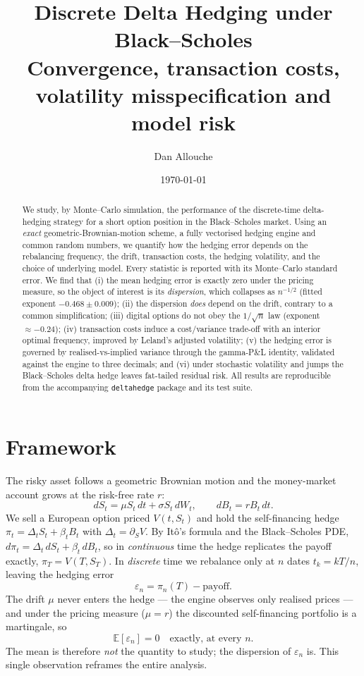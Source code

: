 \documentclass[11pt]{article}
\title{\textbf{Discrete Delta Hedging under Black--Scholes}\\[2pt]
\large Convergence, transaction costs, volatility misspecification and model risk}
\author{Dan Allouche}
\date{\today}
\newcommand{\E}{\mathbb{E}}
\newcommand{\eps}{\varepsilon}
\begin{document}
\maketitle

\begin{abstract}
\noindent
We study, by Monte--Carlo simulation, the performance of the discrete-time
delta-hedging strategy for a short option position in the Black--Scholes market.
Using an \emph{exact} geometric-Brownian-motion scheme, a fully vectorised
hedging engine and common random numbers, we quantify how the hedging error
depends on the rebalancing frequency, the drift, transaction costs, the hedging
volatility, and the choice of underlying model. Every statistic is reported with
its Monte--Carlo standard error. We find that (i) the mean hedging error is
exactly zero under the pricing measure, so the object of interest is its
\emph{dispersion}, which collapses as $n^{-1/2}$ (fitted exponent
$-0.468\pm0.009$); (ii) the dispersion \emph{does} depend on the drift, contrary
to a common simplification; (iii) digital options do not obey the $1/\sqrt{n}$
law (exponent $\approx-0.24$); (iv) transaction costs induce a cost/variance
trade-off with an interior optimal frequency, improved by Leland's adjusted
volatility; (v) the hedging error is governed by realised-vs-implied variance
through the gamma-P\&L identity, validated against the engine to three decimals;
and (vi) under stochastic volatility and jumps the Black--Scholes delta hedge
leaves fat-tailed residual risk. All results are reproducible from the
accompanying \texttt{deltahedge} package and its test suite.
\end{abstract}

\section{Framework}

The risky asset follows a geometric Brownian motion and the money-market account
grows at the risk-free rate $r$:
\[
dS_t = \mu S_t\,dt + \sigma S_t\,dW_t,
\qquad
dB_t = r B_t\,dt .
\]
We sell a European option priced $V(t,S_t)$ and hold the self-financing hedge
$\pi_t = \Delta_t S_t + \beta_t B_t$ with $\Delta_t = \partial_S V$. By It\^o's
formula and the Black--Scholes PDE,
$d\pi_t = \Delta_t\,dS_t + \beta_t\,dB_t$, so in \emph{continuous} time the hedge
replicates the payoff exactly, $\pi_T = V(T,S_T)$. In \emph{discrete} time we
rebalance only at $n$ dates $t_k = kT/n$, leaving the hedging error
\[
\eps_n = \pi_n(T) - \text{payoff}.
\]
The drift $\mu$ never enters the hedge --- the engine observes only realised
prices --- and under the pricing measure ($\mu=r$) the discounted self-financing
portfolio is a martingale, so
\[
\boxed{\;\E[\eps_n] = 0 \quad\text{exactly, at every }n.\;}
\]
The mean is therefore \emph{not} the quantity to study; the dispersion of
$\eps_n$ is. This single observation reframes the entire analysis.
\end{document}

